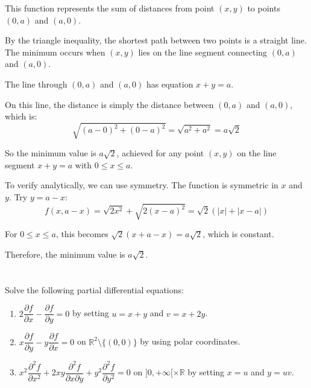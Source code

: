 \documentclass[12pt]{article}
\begin{document}
\begin{correctionbox}
This function represents the sum of distances from point $(x,y)$ to points $(0,a)$ and $(a,0)$.

By the triangle inequality, the shortest path between two points is a straight line. The minimum occurs when $(x,y)$ lies on the line segment connecting $(0,a)$ and $(a,0)$.

The line through $(0,a)$ and $(a,0)$ has equation $x + y = a$.

On this line, the distance is simply the distance between $(0,a)$ and $(a,0)$, which is:
$$\sqrt{(a-0)^2 + (0-a)^2} = \sqrt{a^2 + a^2} = a\sqrt{2}$$

So the minimum value is $a\sqrt{2}$, achieved for any point $(x,y)$ on the line segment $x + y = a$ with $0 \leq x \leq a$.

To verify analytically, we can use symmetry. The function is symmetric in $x$ and $y$. Try $y = a - x$:
$$f(x, a-x) =   \sqrt{2x^2} + \sqrt{2(x-a)^2} = \sqrt{2}(|x| + |x-a|)$$

For $0 \leq x \leq a$, this becomes $\sqrt{2}(x + a - x) = a\sqrt{2}$, which is constant.

Therefore, the minimum value is $a\sqrt{2}$.
\end{correctionbox}

\section{}
Solve the following partial differential equations:

\begin{enumerate}
    \item $2\dfrac{\partial f}{\partial x} - \dfrac{\partial f}{\partial y} = 0$ by setting $u = x + y$ and $v = x + 2y$.
    
    \item $x\dfrac{\partial f}{\partial y} - y\dfrac{\partial f}{\partial x} = 0$ on $\mathbb{R}^2 \setminus \{(0, 0)\}$ by using polar coordinates.
    
    \item $x^2 \dfrac{\partial^2 f}{\partial x^2} + 2xy \dfrac{\partial^2 f}{\partial x \partial y} + y^2 \dfrac{\partial^2 f}{\partial y^2} = 0$ on $]0, +\infty[ \times \mathbb{R}$ by setting $x = u$ and $y = uv$.
\end{enumerate}
\end{document}
